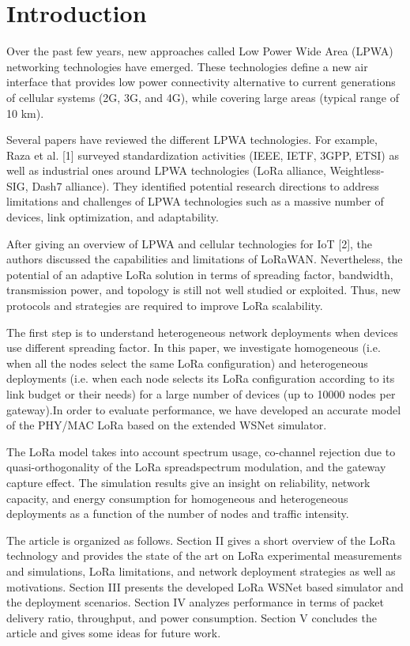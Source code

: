 \section{Introduction} \label{sec:Introduction}

Over the past few years,
	new approaches called Low Power Wide Area (LPWA) networking technologies have emerged.
These technologies define a new air interface that provides low power connectivity alternative to current generations of cellular systems (2G, 3G,
	and 4G),
	while covering large areas (typical range of 10 km).

Several papers have reviewed the different LPWA technologies.
For example,
	Raza et al. [1] surveyed standardization activities (IEEE,
	IETF, 3GPP,
	ETSI) as well as industrial ones around LPWA technologies (LoRa alliance,
	Weightless-SIG,
	Dash7 alliance).
They identified potential research directions to address limitations and challenges of LPWA technologies such as a massive number of devices,
	link optimization,
	and adaptability.

After giving an overview of LPWA and cellular technologies for IoT [2],
	the authors discussed the capabilities and limitations of LoRaWAN.
Nevertheless,
	the potential of an adaptive LoRa solution in terms of spreading factor,
	bandwidth,
	transmission power,
	and topology is still not well studied or exploited.
Thus,
	new protocols and strategies are required to improve LoRa scalability.

The first step is to understand heterogeneous network deployments when devices use different spreading factor.
In this paper,
	we investigate homogeneous (i.e.
when all the nodes select the same LoRa configuration) and heterogeneous deployments (i.e.
when each node selects its LoRa configuration according to its link budget or their needs) for a large number of devices (up to 10000 nodes per gateway).In order to evaluate performance,
	we have developed an accurate model of the PHY/MAC LoRa based on the extended WSNet simulator.

The LoRa model takes into account spectrum usage,
	co-channel rejection due to quasi-orthogonality of the LoRa spreadspectrum modulation,
	and the gateway capture effect.
The simulation results give an insight on reliability,
	network capacity,
	and energy consumption for homogeneous and heterogeneous deployments as a function of the number of nodes and traffic intensity.

The article is organized as follows.
Section II gives a short overview of the LoRa technology and provides the state of the art on LoRa experimental measurements and simulations,
	LoRa limitations,
	and network deployment strategies as well as motivations.
Section III presents the developed LoRa WSNet based simulator and the deployment scenarios.
Section IV analyzes performance in terms of packet delivery ratio,
	throughput,
	and power consumption.
Section V concludes the article and gives some ideas for future work.





